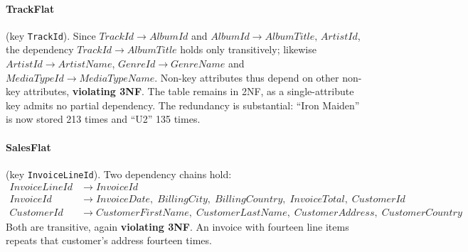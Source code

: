\documentclass[11pt]{article}
\begin{document}
\begin{center}
\end{center}


\paragraph{TrackFlat} (key \texttt{TrackId}). Since
$TrackId \rightarrow AlbumId$ and $AlbumId \rightarrow AlbumTitle,\,ArtistId$, the dependency
$TrackId \rightarrow AlbumTitle$ holds only transitively; likewise
$ArtistId \rightarrow ArtistName$, $GenreId \rightarrow GenreName$ and
$MediaTypeId \rightarrow MediaTypeName$. Non-key attributes thus depend on other non-key
attributes, \textbf{violating 3NF}. The table remains in 2NF, as a single-attribute key admits no
partial dependency. The redundancy is substantial: ``Iron Maiden'' is now stored 213 times and
``U2'' 135 times.

\paragraph{SalesFlat} (key \texttt{InvoiceLineId}). Two dependency chains hold:
\begin{align*}
InvoiceLineId &\rightarrow InvoiceId \\
InvoiceId &\rightarrow
  InvoiceDate,\; BillingCity,\; BillingCountry,\; InvoiceTotal,\; CustomerId \\
CustomerId &\rightarrow
  CustomerFirstName,\; CustomerLastName,\; CustomerAddress,\; CustomerCountry
\end{align*}
Both are transitive, again \textbf{violating 3NF}. An invoice with fourteen line items repeats
that customer's address fourteen times.
\end{document}

